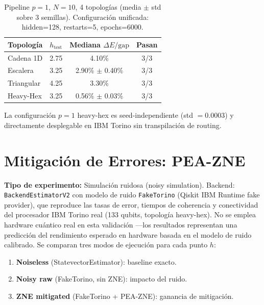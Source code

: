 \documentclass[11pt,a4paper,spanish]{book}
\begin{document}
\begin{table}[h]
\centering
\caption{Pipeline $p = 1$, $N = 10$, 4 topologías (media $\pm$ std sobre 3 semillas). Configuración unificada: hidden=128, restarts=5, epochs=6000.}
\label{tab:results_p1}
\begin{tabular}{lccc}
\toprule
\textbf{Topología} & \textbf{$h_{\text{test}}$} & \textbf{Mediana $\Delta E/\text{gap}$} & \textbf{Pasan} \\
\midrule
Cadena 1D & 2.75 & 4.10\% & 3/3 \\
Escalera & 3.25 & 2.90\% $\pm$ 0.40\% & 3/3 \\
Triangular & 4.25 & 3.30\% & 3/3 \\
Heavy-Hex & 3.25 & 0.56\% $\pm$ 0.03\% & 3/3 \\
\bottomrule
\end{tabular}
\end{table}

La configuración $p=1$ heavy-hex es seed-independiente (std $= 0.0003$) y directamente desplegable en IBM Torino sin transpilación de routing.

\section{Mitigación de Errores: PEA-ZNE}
\label{sec:pea_zne}

\textbf{Tipo de experimento:} Simulación ruidosa (noisy simulation). Backend: \texttt{BackendEstimatorV2} con modelo de ruido \texttt{FakeTorino} (Qiskit IBM Runtime fake provider), que reproduce las tasas de error, tiempos de coherencia y conectividad del procesador IBM Torino real (133 qubits, topología heavy-hex). No se emplea hardware cuántico real en esta validación ---los resultados representan una predicción del rendimiento esperado en hardware basada en el modelo de ruido calibrado. Se comparan tres modos de ejecución para cada punto $h$:
\begin{enumerate}
    \item \textbf{Noiseless} (StatevectorEstimator): baseline exacto.
    \item \textbf{Noisy raw} (FakeTorino, sin ZNE): impacto del ruido.
    \item \textbf{ZNE mitigated} (FakeTorino + PEA-ZNE): ganancia de mitigación.
\end{enumerate}
\end{document}
